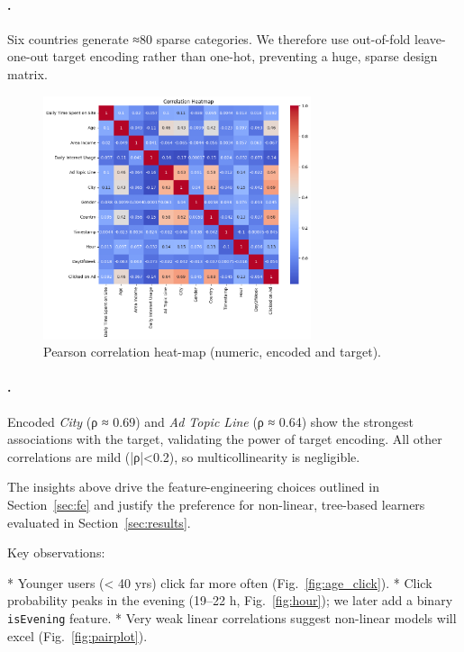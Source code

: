 \documentclass[12pt,a4paper]{article}
\begin{document}
\paragraph{.}
Six countries generate ≈80 %
sparse categories.  We therefore use out-of-fold
leave-one-out target encoding rather than one-hot, preventing a huge,
sparse design matrix.

\begin{figure}[H]
  \centering
  \includegraphics[width=0.7\textwidth]{output9.png}
  \caption{Pearson correlation heat-map (numeric, encoded and target).}
  \label{fig:heatmap}
\end{figure}

\paragraph{.}
Encoded \textit{City} (ρ ≈ 0.69) and \textit{Ad Topic Line}
(ρ ≈ 0.64) show the strongest associations with the target, validating
the power of target encoding.  All other correlations are mild
(|ρ|<0.2), so multicollinearity is negligible.

\vspace{1em}
The insights above drive the feature-engineering choices outlined in
Section~\ref{sec:fe} and justify the preference for non-linear,
tree-based learners evaluated in Section~\ref{sec:results}.


Key observations:

* Younger users (< 40 yrs) click far more often (Fig.~\ref{fig:age_click}).
* Click probability peaks in the evening (19–22 h, Fig.~\ref{fig:hour});
  we later add a binary \texttt{isEvening} feature.
* Very weak linear correlations suggest non-linear models will excel
  (Fig.~\ref{fig:pairplot}).
\end{document}
